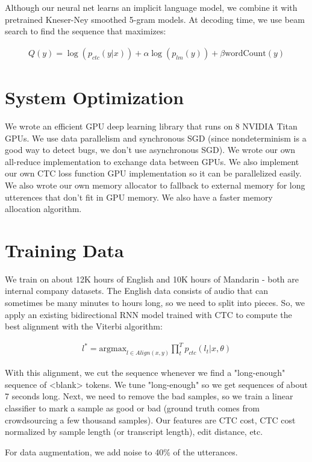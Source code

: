 \documentclass[a4paper]{article}
\begin{document}
Although our neural net learns an implicit language model, we combine it with
pretrained Kneser-Ney smoothed 5-gram models. At decoding time, we use
beam search to find the sequence that maximizes:

\begin{align}
  Q(y) = \log(p_{ctc}(y|x)) + \alpha \log(p_{lm}(y)) + \beta \text{wordCount}(y)
\end{align}

\section{System Optimization}
We wrote an efficient GPU deep learning library that runs on 8 NVIDIA Titan
GPUs. We use data parallelism and synchronous SGD (since nondeterminism is
a good way to detect bugs, we don't use asynchronous SGD). We wrote our own
all-reduce implementation to exchange data between GPUs. We also implement our
own CTC loss function GPU implementation so it can be parallelized easily. We
also wrote our own memory allocator to fallback to external memory for
long utterences that don't fit in GPU memory. We also have a faster memory
allocation algorithm.

\section{Training Data}
We train on about 12K hours of English and 10K hours of Mandarin - both are
internal company datasets. The English data consists of audio that can sometimes
be many minutes to hours long, so we need to split into pieces. So, we apply
an existing bidirectional RNN model trained with CTC to compute the best
alignment with the Viterbi algorithm:

\begin{align}
  l^* =
    \text{argmax}_{l \in Align(x, y)}{\prod_{t}^{T}{p_{ctc}(l_t | x, \theta)}}
\end{align}

With this alignment, we cut the sequence whenever we find a "long-enough"
sequence of <blank> tokens. We tune "long-enough" so we get sequences of about
7 seconds long. Next, we need to remove the bad samples, so we train a
linear classifier to mark a sample as good or bad (ground truth comes from
crowdsourcing a few thousand samples). Our features are CTC cost,
CTC cost normalized by sample length (or transcript length), edit distance,
etc.

For data augmentation, we add noise to 40\% of the utterances.
\end{document}
